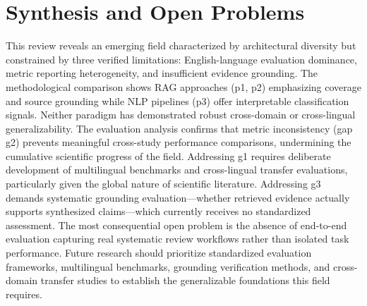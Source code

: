 \documentclass{article}
\begin{document}
\section{Synthesis and Open Problems}
This review reveals an emerging field characterized by architectural diversity but constrained by three verified limitations: English-language evaluation dominance, metric reporting heterogeneity, and insufficient evidence grounding. The methodological comparison shows RAG approaches (p1, p2) emphasizing coverage and source grounding while NLP pipelines (p3) offer interpretable classification signals. Neither paradigm has demonstrated robust cross-domain or cross-lingual generalizability. The evaluation analysis confirms that metric inconsistency (gap g2) prevents meaningful cross-study performance comparisons, undermining the cumulative scientific progress of the field. Addressing g1 requires deliberate development of multilingual benchmarks and cross-lingual transfer evaluations, particularly given the global nature of scientific literature. Addressing g3 demands systematic grounding evaluation—whether retrieved evidence actually supports synthesized claims—which currently receives no standardized assessment. The most consequential open problem is the absence of end-to-end evaluation capturing real systematic review workflows rather than isolated task performance. Future research should prioritize standardized evaluation frameworks, multilingual benchmarks, grounding verification methods, and cross-domain transfer studies to establish the generalizable foundations this field requires.
\end{document}
